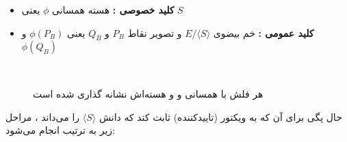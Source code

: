 \begin{itemize}
\item {\textbf{کلید خصوصی :} }
هسته همسانی
$\phi$
یعنی
$S$

\item {\textbf{کلید عمومی :} }
خم بیضوی
$E/ \langle S \rangle$
و تصویر نقاط  
$P_B$ 
و
$Q_B$
یعنی
$\phi(P_B)$
و	
$\phi(Q_B)$	
\end{itemize}~ 
\begin{figure}[H] 
	\begin{center}
		
		
		\caption{
			هر فلش با همسانی و و هسته‌اش نشانه گذاری شده است    
		}
		\label{fig:zkp}
		
	\end{center}
\end{figure}
\vskip 0.5in
حال پگی برای آن که به ویکتور (تاییدکننده) ثابت کند که دانش 
$\langle S \rangle $
را می‌داند ، مراحل زیر به ترتیب انجام می‌شود:
